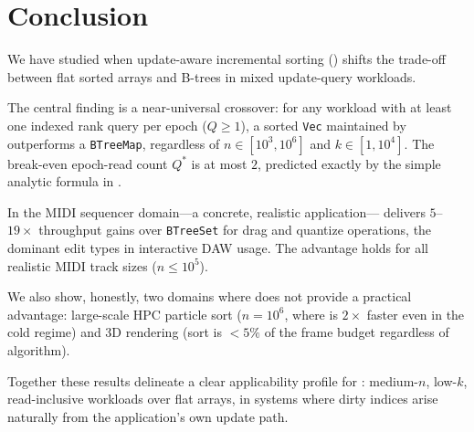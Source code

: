 \section{Conclusion}
\label{sec:conclusion}

We have studied when update-aware incremental sorting (\DeltaSort) shifts
the trade-off between flat sorted arrays and B-trees in mixed update-query workloads.

The central finding is a near-universal crossover:
for any workload with at least one indexed rank query per epoch ($Q \geq 1$),
a sorted \texttt{Vec} maintained by \DeltaSort outperforms a \texttt{BTreeMap},
regardless of $n \in [10^3, 10^6]$ and $k \in [1, 10^4]$.
The break-even epoch-read count $Q^*$ is at most $2$, predicted exactly by
the simple analytic formula in .

In the MIDI sequencer domain---a concrete, realistic application---\DeltaSort
delivers $5$--$19\times$ throughput gains over \texttt{BTreeSet} for drag and
quantize operations, the dominant edit types in interactive DAW usage.
The advantage holds for all realistic MIDI track sizes ($n \leq 10^5$).

We also show, honestly, two domains where \DeltaSort does not provide
a practical advantage: large-scale HPC particle sort ($n=10^6$, where \ESM
is $2\times$ faster even in the cold regime) and 3D rendering (sort is
$<5\%$ of the frame budget regardless of algorithm).

Together these results delineate a clear applicability profile for \DeltaSort:
medium-$n$, low-$k$, read-inclusive workloads over flat arrays, in systems
where dirty indices arise naturally from the application's own update path.
